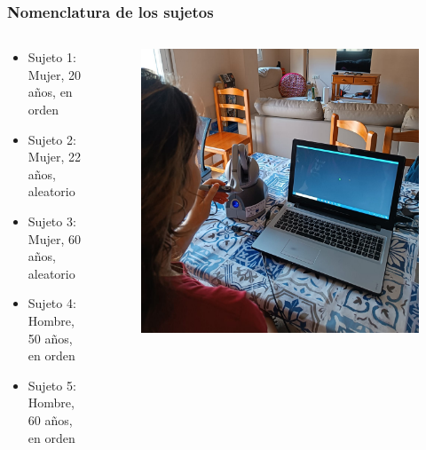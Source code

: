 \documentclass[pdf]{beamer}
\begin{document}
\begin{frame}
	\frametitle{Nomenclatura de los sujetos}
\begin{columns}
	\begin{column}{0.5\textwidth}
		\begin{itemize}
			\item Sujeto 1: Mujer, 20 años, en orden
			\item Sujeto 2: Mujer, 22 años, aleatorio
			\item Sujeto 3: Mujer, 60 años, aleatorio
			\item Sujeto 4: Hombre, 50 años, en orden
			\item Sujeto 5: Hombre, 60 años, en orden
		\end{itemize}
	\end{column}
	\begin{column}{0.5\textwidth}
		\begin{figure}
			\centering
			
			\includegraphics[width=\textwidth]{sujeto-2}
			
		\end{figure}
	\end{column}
\end{columns}
		

			
\end{frame}
\end{document}
